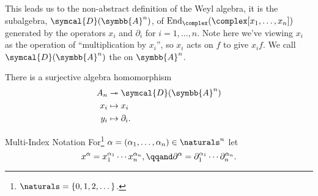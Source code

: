 \documentclass[fleqn]{NotesClass}
\newcommand{\D}{\symcal{D}}
\DeclareMathOperator{\End}{End}
\newcommand{\affine}{\symbb{A}}
\begin{document}
    This leads us to the non-abstract definition of the Weyl algebra, it is the subalgebra, \(\D(\affine^n)\), of \(\End_{\complex}(\complex[x_1, \dotsc, x_n])\) generated by the operators \(x_i\) and \(\partial_i\) for \(i = 1, \dotsc, n\).
    Note here we've viewing \(x_i\) as the operation of \enquote{multiplication by \(x_i\)}, so \(x_i\) acts on \(f\) to give \(x_if\).
    We call \(\D(\affine^n)\) the  on \(\affine^n\).
    
    \begin{lma}{}{}
        There is a surjective algebra homomorphism
        \begin{align}
            A_n &\twoheadrightarrow \D(\affine^n)\\
            x_i &\mapsto x_i\\
            y_i &\mapsto \partial_i.
        \end{align}
    \end{lma}
    
    \begin{ntn}{Multi-Index Notation}{}
        For\footnote{\(\naturals = \{0, 1, 2, \dotsc\}\).} \(\alpha = (\alpha_1, \dotsc, \alpha_n) \in \naturals^n\) let
        \begin{equation}
            x^\alpha = x_1^{\alpha_1} \dotsm x_n^{\alpha_n}, \qqand \partial^\alpha = \partial_1^{\alpha_1} \dotsm \partial_n^{\alpha_n}.
        \end{equation}
    \end{ntn}
    
\end{document}
